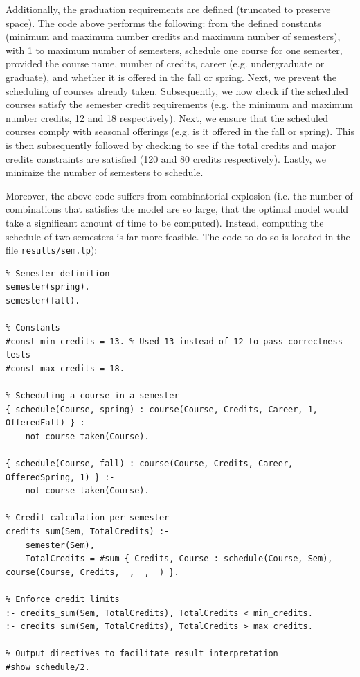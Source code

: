 \documentclass[12pt]{article}
\begin{document}
    Additionally, the graduation requirements are defined (truncated to preserve space). The code above performs the following: from the defined constants (minimum and maximum number credits and maximum number of semesters), with 1 to maximum number of semesters, schedule one course for one semester, provided the course name, number of credits, career (e.g. undergraduate or graduate), and whether it is offered in the fall or spring. Next, we prevent the scheduling of courses already taken. Subsequently, we now check if the scheduled courses satisfy the semester credit requirements (e.g. the minimum and maximum number credits, 12 and 18 respectively). Next, we ensure that the scheduled courses comply with seasonal offerings (e.g. is it offered in the fall or spring). This is then subsequently followed by checking to see if the total credits and major credits constraints are satisfied (120 and 80 credits respectively). Lastly, we minimize the number of semesters to schedule.
    
    Moreover, the above code suffers from combinatorial explosion (i.e. the number of combinations that satisfies the model are so large, that the optimal model would take a significant amount of time to be computed).
    Instead, computing the schedule of two semesters is far more feasible. The code to do so is located in the file {\tt{results/sem.lp}}): \\

    \begin{lstlisting}
% Semester definition
semester(spring).
semester(fall).

% Constants
#const min_credits = 13. % Used 13 instead of 12 to pass correctness tests
#const max_credits = 18.

% Scheduling a course in a semester
{ schedule(Course, spring) : course(Course, Credits, Career, 1, OfferedFall) } :-
    not course_taken(Course).

{ schedule(Course, fall) : course(Course, Credits, Career, OfferedSpring, 1) } :-
    not course_taken(Course).

% Credit calculation per semester
credits_sum(Sem, TotalCredits) :-
    semester(Sem),
    TotalCredits = #sum { Credits, Course : schedule(Course, Sem), course(Course, Credits, _, _, _) }.

% Enforce credit limits
:- credits_sum(Sem, TotalCredits), TotalCredits < min_credits.
:- credits_sum(Sem, TotalCredits), TotalCredits > max_credits.

% Output directives to facilitate result interpretation
#show schedule/2.
    \end{lstlisting}
\end{document}
